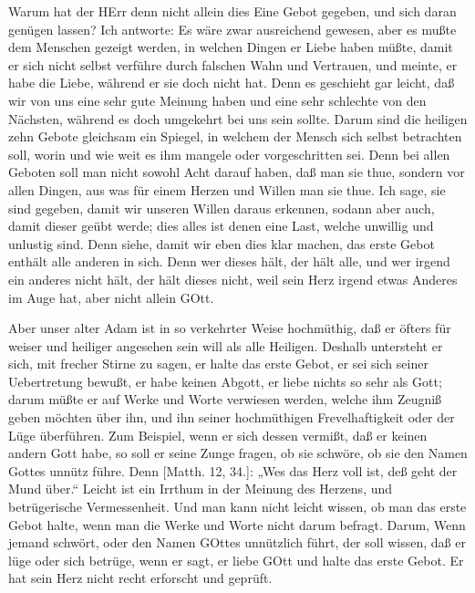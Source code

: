 Warum hat der HErr denn nicht allein dies Eine Gebot gegeben, und sich daran genügen lassen? Ich antworte: Es wäre zwar ausreichend gewesen, aber es mußte dem Menschen gezeigt werden, in welchen Dingen er Liebe haben müßte, damit er sich nicht selbst verführe durch falschen Wahn und Vertrauen, und meinte, er habe die Liebe, während er sie doch nicht hat. Denn es geschieht gar leicht, daß wir von uns eine sehr gute Meinung haben und eine sehr schlechte von den Nächsten, während es doch umgekehrt bei uns sein sollte. Darum sind die heiligen zehn Gebote gleichsam ein Spiegel, in welchem der Mensch sich selbst betrachten soll, worin und wie weit es ihm mangele oder vorgeschritten sei. Denn bei allen Geboten soll man nicht sowohl Acht darauf haben, daß man sie thue, sondern vor allen Dingen, aus was für einem Herzen und Willen man sie thue. Ich sage, sie sind gegeben, damit wir unseren Willen daraus erkennen, sodann aber auch, damit dieser geübt werde; dies alles ist denen eine Last, welche unwillig und unlustig sind. Denn siehe, damit wir eben dies klar machen, das erste Gebot enthält alle anderen in sich. Denn wer dieses hält, der hält alle, und wer irgend ein anderes nicht hält, der hält dieses nicht, weil sein Herz irgend etwas Anderes im Auge hat, aber nicht allein GOtt.

Aber unser alter Adam ist in so verkehrter Weise hochmüthig, daß er öfters für weiser und heiliger angesehen sein will als alle Heiligen. Deshalb untersteht er sich, mit frecher Stirne zu sagen, er halte das erste Gebot, er sei sich seiner Uebertretung bewußt, er habe keinen Abgott, er liebe nichts so sehr als Gott; darum müßte er auf Werke und Worte verwiesen werden, welche ihm Zeugniß geben möchten über ihn, und ihn seiner hochmüthigen Frevelhaftigkeit oder der Lüge überführen. Zum Beispiel, wenn er sich dessen vermißt, daß er keinen andern Gott habe, so soll er seine Zunge fragen, ob sie schwöre, ob sie den Namen Gottes unnütz führe. Denn [Matth. 12, 34.]: „Wes das Herz voll ist, deß geht der Mund über.“ Leicht ist ein Irrthum in der Meinung des Herzens, und betrügerische Vermessenheit. Und man kann nicht leicht wissen, ob man das erste Gebot halte, wenn man die Werke und Worte nicht darum befragt. Darum,
Wenn jemand schwört, oder den Namen GOttes unnützlich führt, der soll wissen, daß er lüge oder sich betrüge, wenn er sagt, er liebe GOtt und halte das erste Gebot. Er hat sein Herz nicht recht erforscht und geprüft.

